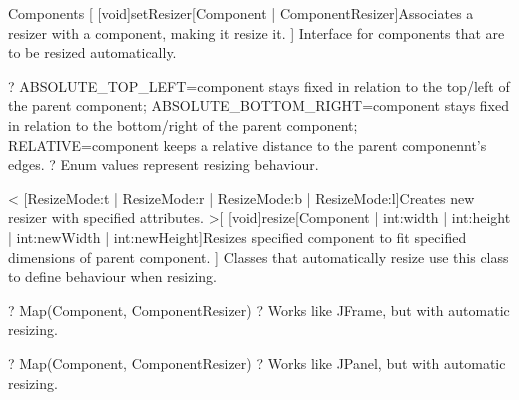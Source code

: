 \begin{package}{Components}
    [
        \func{+}[void]{setResizer}[Component | ComponentResizer]{Associates a resizer with a component, making it resize it.}
    ]{
        Interface for components that are to be resized automatically.
    }

    ?
        ABSOLUTE\_TOP\_LEFT=component stays fixed in relation to the top/left of the parent component;
        ABSOLUTE\_BOTTOM\_RIGHT=component stays fixed in relation to the bottom/right of the parent component;
        RELATIVE=component keeps a relative distance to the parent componennt's edges.
    ?{
        Enum values represent resizing behaviour.
    }

    <
        [ResizeMode:t | ResizeMode:r | ResizeMode:b | ResizeMode:l]{Creates new resizer with specified attributes.}
    >[
        \func{+}[void]{resize}[Component | int:width | int:height | int:newWidth | int:newHeight]{Resizes specified component to fit specified dimensions of parent component.}
    ]{
        Classes that automatically resize use this class to define behaviour when resizing.
    }

    ?
        Map(Component, ComponentResizer)
    ?{
        Works like JFrame, but with automatic resizing.
    }

    ?
        Map(Component, ComponentResizer)
    ?{
        Works like JPanel, but with automatic resizing.
    }

\end{package}

